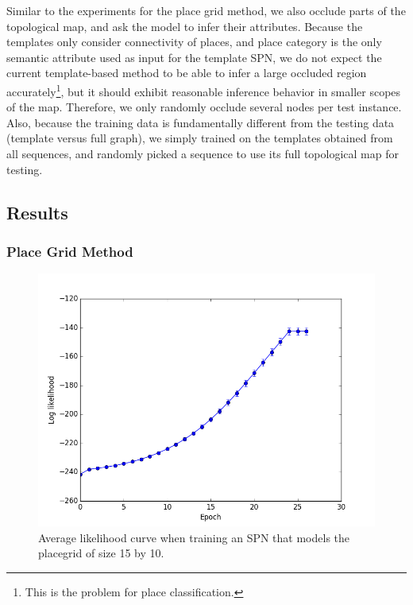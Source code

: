 \documentclass[10pt, titlepage]{article}
\theoremstyle{definition}
\begin{document}
Similar to the experiments for the place grid method, we also occlude parts of the topological map, and ask the model to infer their attributes. Because the templates only consider connectivity of places, and place category is the only semantic attribute used as input for the template SPN, we do not expect the current template-based method to be able to infer a large occluded region accurately\footnote{This is the problem for place classification.}, but it should exhibit reasonable inference behavior in smaller scopes of the map. Therefore, we only randomly occlude several nodes per test instance. Also, because the training data is fundamentally different from the testing data (template versus full graph), we simply trained on the templates obtained from all sequences, and randomly picked a sequence to use its full topological map for testing. 



\subsection{Results}\label{section:results}

\subsubsection{Place Grid Method}

\begin{figure}[!htb]
    \centering
    \captionsetup{width=.6\linewidth}
    \includegraphics[scale=0.4]{images/likelihood.png}
    \caption{Average likelihood curve when training an SPN that models the placegrid of size 15 by 10. }
    \label{fig:likelihood}
\end{figure}
\end{document}
